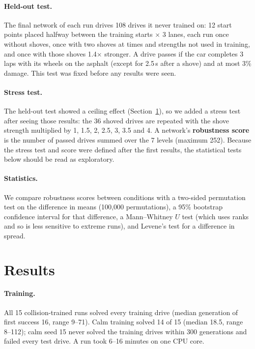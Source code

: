 \documentclass[11pt,a4paper]{article}
\begin{document}
\paragraph{Held-out test.} The final network of each run drives 108 drives it never trained on: 12 start points placed halfway between the training starts $\times$ 3 lanes, each run once without shoves, once with two shoves at times and strengths not used in training, and once with those shoves 1.4$\times$ stronger. A drive passes if the car completes 3 laps with its wheels on the asphalt (except for 2.5\,s after a shove) and at most 3\% damage. This test was fixed before any results were seen.

\paragraph{Stress test.} The held-out test showed a ceiling effect (Section~\ref{sec:results}), so we added a stress test after seeing those results: the 36 shoved drives are repeated with the shove strength multiplied by 1, 1.5, 2, 2.5, 3, 3.5 and 4. A network's \textbf{robustness score} is the number of passed drives summed over the 7 levels (maximum 252). Because the stress test and score were defined after the first results, the statistical tests below should be read as exploratory.

\paragraph{Statistics.} We compare robustness scores between conditions with a two-sided permutation test on the difference in means (100{,}000 permutations), a 95\% bootstrap confidence interval for that difference, a Mann--Whitney $U$ test (which uses ranks and so is less sensitive to extreme runs), and Levene's test for a difference in spread.

\section{Results}\label{sec:results}
\paragraph{Training.} All 15 collision-trained runs solved every training drive (median generation of first success 16, range 9--71). Calm training solved 14 of 15 (median 18.5, range 8--112); calm seed 15 never solved the training drives within 300 generations and failed every test drive. A run took 6--16 minutes on one CPU core.
\end{document}
